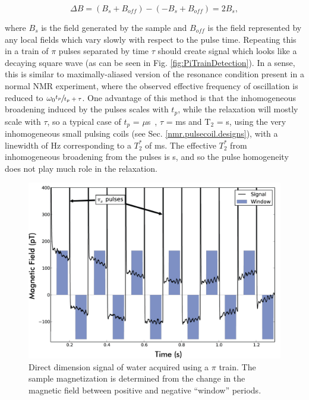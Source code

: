 \documentclass[PaulGanssle-Thesis.tex]{subfiles}
\begin{document}
\begin{equation}
\Delta B = (B_{s} + B_{off}) - (-B_{s} + B_{off}) = 2B_{s},
\end{equation}

where $B_{s}$ is the field generated by the sample and $B_{off}$ is the field represented by any local fields which vary slowly with respect to the pulse time. Repeating this in a train of $\pi$ pulses separated by time $\tau$ should create signal which looks like a decaying square wave (as can be seen in Fig. \ref{fig:PiTrainDetection}). In a sense, this is similar to maximally-aliased version of the resonance condition present in a normal NMR experiment, where the observed effective frequency of oscillation is reduced to $\omega_0\sfrac{t_p}{t_p+\tau}$. One advantage of this method is that the inhomogeneous broadening induced by the pulses scales with $t_p$, while the relaxation will mostly scale with $\tau$, so a typical case of $t_p$ = \unit[100]{$\mu$s}, $\tau$ = \unit[50]{ms} and $\mathrm{T}_{2}$ = \unit[3]{s}, using the very inhomogeneous small pulsing coils (see Sec. \ref{nmr.pulsecoil.designs}), with a linewidth of \unit[2]{Hz} corresponding to a $T_{2}^{\mathbf{*}}$ of \unit[159]{ms}. The effective $T_{2}^{\mathbf{*}}$ from inhomogeneous broadening from the pulses is \unit[79]{s}, and so the pulse homogeneity does not play much role in the relaxation.

\begin{figure}[h!]
\includegraphics[width=\tw]{figures/relaxometry/12-07-17-WaterFIDFirst.png}
\caption{Direct dimension signal of water acquired using a $\pi$ train. The sample magnetization is determined from the change in the magnetic field between positive and negative ``window'' periods.}
\label{fig:PiTrainData}
\end{figure}
\end{document}
